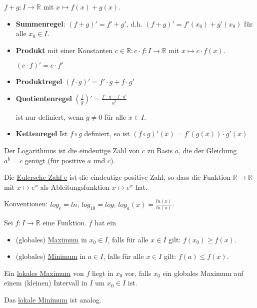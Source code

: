 \documentclass{mg2}
\begin{document}
$f+g: I \to \mathbb{R}$ mit $x \mapsto f(x) + g(x)$.
\begin{itemize}
\item \textbf{Summenregel}: $(f+g)' = f' + g'$, d.h. $(f+g)' = f'(x_0) + g'(x_0)$ für alle $x_0 \in I$.
\item \textbf{Produkt} mit einer Konstanten $c \in \mathbb{R}: c \cdot f: I \to \mathbb{R}$ mit $x \mapsto c \cdot f(x)$.

	$(c\cdot f)' = c \cdot f'$
\item \textbf{Produktregel} $(f\cdot g)' = f' \cdot g + f \cdot g'$
\item \textbf{Quotientenregel} $(\frac{f}{g})' = \frac{f' \cdot g - f \cdot g'}{g^2}$
	
	ist nur definiert, wenn $g \neq 0$ für alle $x \in I$.
\item \textbf{Kettenregel} Ist $f \circ g$ definiert, so ist $(f \circ g)'(x) = f'(g(x)) \cdot g'(x)$
\end{itemize}

\begin{definition}[Logarithmus]
Der \underline{Logarithmus} ist die eindeutige Zahl von $c$ zu Basis $a$, die der Gleichung $a^b = c$ genügt (für positive $a$ und $c$).
\end{definition}

\begin{definition}
Die \underline{Eulersche Zahl e} ist die eindeutige positive Zahl, so dass die Funktion $\mathbb{R} \to \mathbb{R}$ mit $x \mapsto e^x$ als Ableitungsfunktion $x \mapsto e^x$ hat.

Konventionen: $log_e = ln$, $log_{10} = log$, $log_a (x) = \frac{ln(x)}{ln(a)}$.
\end{definition}

\begin{definition}
Sei $f: I \to \mathbb{R}$ eine Funktion. $f$ hat ein
\begin{itemize}
\item (globales) \underline{Maximum} in $x_0 \in I$, falls für alle $x \in I$ gilt: $f(x_0) \geq f(x)$.
\item (globales) \underline{Minimum} in $a \in I$, falls für alle $x \in I$ gilt: $f(a) \leq f(x)$.
\end{itemize}
\end{definition}

\begin{definition}
Ein \underline{lokales Maximum} von $f$ liegt in $x_0$ vor, falls $x_0$ ein globales Maximum auf einem (kleinen) Intervall in $I$ um $x_0 \in I$ ist.

Das \underline{lokale Minimum} ist analog.
\end{definition}
\end{document}
